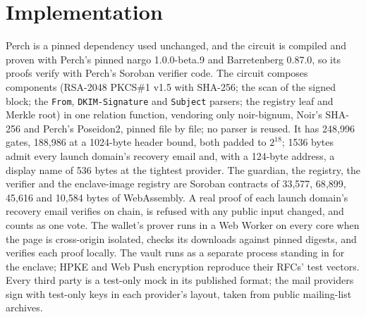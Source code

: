 \section{Implementation}\label{sec:impl}

Perch is a pinned dependency used unchanged, and the circuit is compiled and
proven with Perch's pinned nargo 1.0.0-beta.9 and Barretenberg 0.87.0, so
its proofs verify with Perch's Soroban verifier code. The circuit composes
components (RSA-2048 PKCS\#1 v1.5 with SHA-256; the scan of the signed block;
the \texttt{From}, \texttt{DKIM-Signature} and \texttt{Subject} parsers; the
registry leaf and Merkle root) in one relation function, vendoring only
noir-bignum, Noir's SHA-256 and Perch's Poseidon2, pinned file by file; no
parser is reused. It has 248{,}996 gates, 188{,}986
at a 1024-byte header bound, both padded to $2^{18}$; 1536 bytes admit every
launch domain's recovery email and, with a 124-byte address, a display name
of 536 bytes at the tightest provider.
The guardian, the registry, the verifier and the enclave-image registry are
Soroban contracts of 33{,}577, 68{,}899, 45{,}616 and 10{,}584 bytes of
WebAssembly. A real proof of each launch domain's
recovery email verifies on chain, is refused with any public input changed,
and counts as one vote. The wallet's prover runs in
a Web Worker on every core when the page is cross-origin isolated, checks its
downloads against pinned digests, and verifies each proof
locally. The vault runs as a separate process standing
in for the enclave; HPKE and Web Push encryption reproduce their RFCs' test
vectors. Every third party is a test-only mock in its
published format; the mail providers sign with test-only keys in each
provider's layout, taken from public mailing-list
archives.
